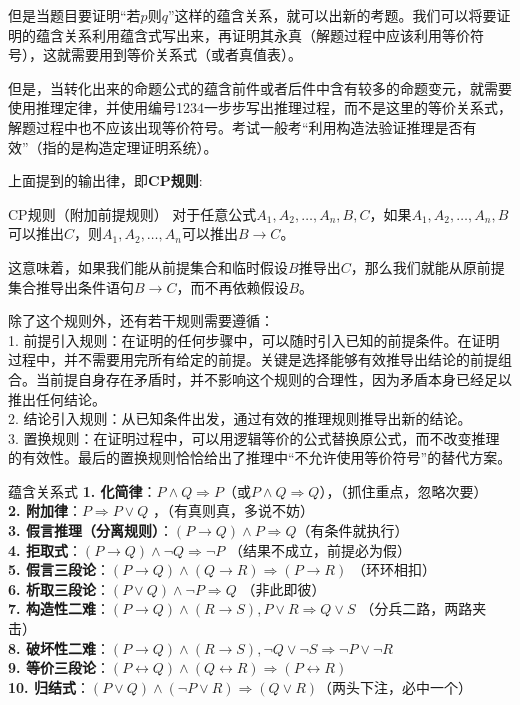但是当题目要证明“若$p$则$q$”这样的蕴含关系，就可以出新的考题。我们可以将要证明的蕴含关系利用蕴含式写出来，再证明其永真（解题过程中应该利用等价符号），这就需要用到等价关系式（或者真值表）。

但是，当转化出来的命题公式的蕴含前件或者后件中含有较多的命题变元，就需要使用推理定律，并使用编号1234一步步写出推理过程，而不是这里的等价关系式，解题过程中也不应该出现等价符号。考试一般考“利用构造法验证推理是否有效”（指的是构造定理证明系统）。

上面提到的输出律，即\textbf{CP规则}:
\begin{theorem}{CP规则（附加前提规则）}{}
对于任意公式$A_1, A_2, \ldots, A_n, B, C$，如果$A_1, A_2, \ldots, A_n, B$可以推出$C$，则$A_1, A_2, \ldots, A_n$可以推出$B \rightarrow C$。

这意味着，如果我们能从前提集合和临时假设$B$推导出$C$，那么我们就能从原前提集合推导出条件语句$B \rightarrow C$，而不再依赖假设$B$。
\end{theorem}
除了这个规则外，还有若干规则需要遵循：\\
1. 前提引入规则：在证明的任何步骤中，可以随时引入已知的前提条件。在证明过程中，并不需要用完所有给定的前提。关键是选择能够有效推导出结论的前提组合。当前提自身存在矛盾时，并不影响这个规则的合理性，因为矛盾本身已经足以推出任何结论。\\
2. 结论引入规则：从已知条件出发，通过有效的推理规则推导出新的结论。\\
3. 置换规则：在证明过程中，可以用逻辑等价的公式替换原公式，而不改变推理的有效性。最后的置换规则恰恰给出了推理中“不允许使用等价符号”的替代方案。
\begin{theorem}{蕴含关系式}{}
\textbf{1. 化简律}：$P \land Q \Rightarrow P$（或$P \land Q \Rightarrow Q$），（抓住重点，忽略次要）\\
\textbf{2. 附加律}：$P \Rightarrow P \lor Q$ ，（有真则真，多说不妨）\\
\textbf{3. 假言推理（分离规则）}：$(P \rightarrow Q) \land P \Rightarrow Q$（有条件就执行） \\
\textbf{4. 拒取式}：$(P \rightarrow Q) \land \neg Q \Rightarrow \neg P$ （结果不成立，前提必为假）\\
\textbf{5. 假言三段论}：$(P \rightarrow Q) \land (Q \rightarrow R) \Rightarrow (P \rightarrow R)$ （环环相扣）\\
\textbf{6. 析取三段论}：$(P \lor Q) \land \neg P \Rightarrow Q$ （非此即彼）\\
\textbf{7. 构造性二难}：$(P \rightarrow Q) \land (R \rightarrow S),P \lor R \Rightarrow Q \lor S$ （分兵二路，两路夹击）\\
\textbf{8. 破坏性二难}：$(P \rightarrow Q) \land (R \rightarrow S) ,\neg Q \lor \neg S \Rightarrow \neg P \lor \neg R$ \\
\textbf{9. 等价三段论}：$(P \leftrightarrow Q) \land (Q \leftrightarrow R) \Rightarrow (P \leftrightarrow R)$ \\
\textbf{10. 归结式}：$(P \lor Q) \land (\neg P \lor R) \Rightarrow (Q \lor R)$（两头下注，必中一个）
\end{theorem}
